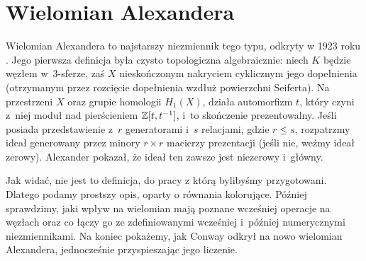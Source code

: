 
\section{Wielomian Alexandera}
%

Wielomian Alexandera to najstarszy niezmiennik tego typu, odkryty w 1923 roku \cite{alexander23}.
Jego pierwsza definicja była czysto topologiczna algebraicznie: niech $K$ będzie węzłem w~3-sferze, zaś $X$ nieskończonym nakryciem cyklicznym jego dopełnienia (otrzymanym przez rozcięcie dopełnienia wzdłuż powierzchni Seiferta).
Na przestrzeni $X$ oraz grupie homologii $H_1(X)$, działa automorfizm $t$, który czyni z~niej moduł nad pierścieniem $\mathbb Z[t, t^{-1}]$, i~to skończenie prezentowalny.
Jeśli posiada przedstawienie z~$r$ generatorami i~$s$ relacjami, gdzie $r \le s$, rozpatrzmy ideał generowany przez minory $r \times r$ macierzy prezentacji (jeśli nie, weźmy ideał zerowy).
Alexander pokazał, że ideał ten zawsze jest niezerowy i~główny.

Jak widać, nie jest to definicja, do pracy z którą bylibyśmy przygotowani.
Dlatego podamy prostszy opis, oparty o równania kolorujące.
Później sprawdzimy, jaki wpływ na wielomian mają poznane wcześniej operacje na węzłach oraz co łączy go ze zdefiniowanymi wcześniej i~później numerycznymi niezmiennikami.
Na koniec pokażemy, jak Conway odkrył na nowo wielomian Alexandera, jednocześnie przyspieszając jego liczenie.















